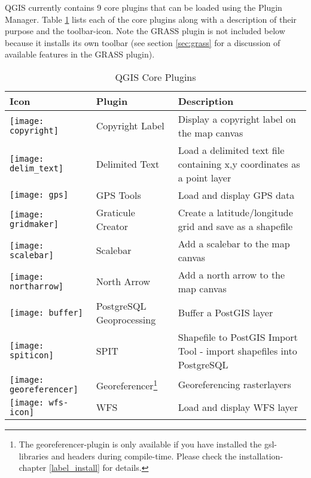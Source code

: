QGIS currently contains 9 core plugins that can be loaded using the Plugin Manager.
Table \ref{tab:core_plugins} lists each of the core plugins along with a description of their purpose and the toolbar-icon.
Note the GRASS plugin is not included below because it installs its own toolbar (see section \ref{sec:grass} for a discussion of available features in the GRASS plugin).

\begin{minipage}{\textwidth}
\begin{table}[H]
\centering
\caption{QGIS Core Plugins}\label{tab:core_plugins}\medskip
\small
 \begin{tabular}{|l|l|p{4in}|}
\hline \textbf{Icon} & \textbf{Plugin} & \textbf{Description} \\
\hline 
\texttt{[image: copyright]} & Copyright Label \index{plugins!copyright}& Display a copyright label on the map canvas\\
\hline 
\texttt{[image: delim\_text]} & Delimited Text \index{plugins!delimited text}& Load a delimited text file containing x,y coordinates as a point layer \\
\hline 
\texttt{[image: gps]} & GPS Tools \index{plugins!gps}& Load and display GPS data \\
\hline 
\texttt{[image: gridmaker]} & Graticule Creator \index{plugins!graticule}& Create a latitude/longitude grid and save as a shapefile\\
\hline 
\texttt{[image: scalebar]} & Scalebar \index{plugins!scalebar}& Add a scalebar to the map canvas\\
\hline 
\texttt{[image: northarrow]}& North Arrow \index{plugins!north arrow}& Add a north arrow to the map canvas\\
\hline 
\texttt{[image: buffer]} & PostgreSQL Geoprocessing \index{plugins!geoprocessing}& Buffer a PostGIS layer \\
\hline 
\texttt{[image: spiticon]} & SPIT \index{plugins!SPIT}& Shapefile to PostGIS Import Tool - import shapefiles into PostgreSQL\\
\hline
\texttt{[image: georeferencer]} & Georeferencer\footnote{The
georeferencer-plugin is only available if you have installed the
gsl-libraries and headers during compile-time. Please check the
installation-chapter \ref{label_install} for details.} \index{plugin!Georeferencer} & Georeferencing rasterlayers \\
\hline
\texttt{[image: wfs-icon]} & WFS & Load and display WFS layer \\
\hline
\end{tabular}
\end{table}
\end{minipage}

